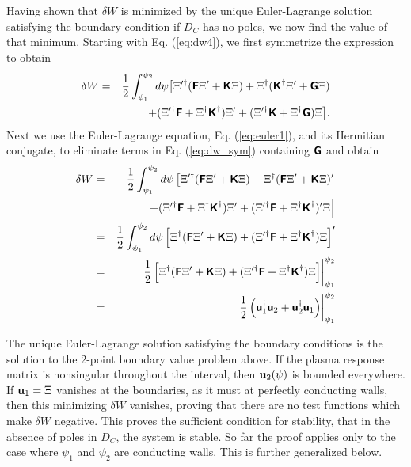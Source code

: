 \documentclass[prb,twocolumn,showpacs,preprintnumbers,amsmath,amssymb]{revtex4}
\renewcommand*{\v}[1]{\hbox{\bfseries #1}}
\renewcommand*{\t}[1]{\hbox{\sffamily\bfseries #1}}
\begin{document}
Having shown that $\delta W$ is minimized by the unique Euler-Lagrange
solution satisfying the boundary condition if $D_C$ has no poles, we now
find the value of that minimum.  Starting with Eq. (\ref{eq:dw4}), we
first symmetrize the expression to obtain
\begin{eqnarray}
\delta W =&& \frac{1}{2} \int_{\psi_1}^{\psi_2} d\psi \big[ 
	\Xi'^\dagger (\t{F} \Xi' + \t{K} \Xi) 
	+ \Xi^\dagger (\t{K}^\dagger \Xi' + \t{G} \Xi) \nonumber \\
&&+ ( \Xi'^\dagger \t{F} + \Xi^\dagger \t{K}^\dagger) \Xi'
	+ ( \Xi'^\dagger \t{K} + \Xi^\dagger \t{G}) \Xi \big].
\label{eq:dw_sym}
\end{eqnarray}
Next we use the Euler-Lagrange equation, Eq. (\ref{eq:euler1}), and its
Hermitian conjugate, to eliminate terms in Eq. (\ref{eq:dw_sym})
containing $\t{G}$ and obtain
\begin{eqnarray}
\delta W
=&& \frac{1}{2} \int_{\psi_1}^{\psi_2} d\psi \left[ 
	\Xi'^\dagger (\t{F} \Xi' + \t{K} \Xi) 
	+ \Xi^\dagger (\t{F} \Xi' + \t{K} \Xi)' \right. \nonumber \\
&&\left. + ( \Xi'^\dagger \t{F} + \Xi^\dagger \t{K}^\dagger) \Xi'
	+ ( \Xi'^\dagger \t{F} + \Xi^\dagger \t{K}^\dagger)' 
	\Xi \right] \nonumber \\
=&& \frac{1}{2} \int_{\psi_1}^{\psi_2} d\psi \left[ 
	\Xi^\dagger (\t{F} \Xi' + \t{K} \Xi) 
	+ (\Xi'^\dagger \t{F} + \Xi^\dagger \t{K}^\dagger)
	\Xi \right]' \nonumber \\
=&& \left. \frac{1}{2} \left[ 
	\Xi^\dagger (\t{F} \Xi' + \t{K} \Xi)
	+ (\Xi'^\dagger \t{F} + \Xi^\dagger \t{K}^\dagger) \Xi
	 \right] \right|_{\psi_1}^{\psi_2} \nonumber \\
=&& \left. \frac{1}{2} \left( \t{u}_1^\dagger \t{u}_2 
	+ \t{u}_2^\dagger \t{u}_1 \right) \right|_{\psi_1}^{\psi_2}
\label{eq:dw_boundary}
\end{eqnarray}

	The unique Euler-Lagrange solution satisfying the boundary
conditions is the solution to the 2-point boundary value problem above.
If the plasma response matrix is nonsingular throughout the interval,
then $\v{u}_2(\psi)$ is bounded everywhere.  If $\v{u}_1=\Xi$ vanishes
at the boundaries, as it must at perfectly conducting walls, then this
minimizing $\delta W$ vanishes, proving that there are no test functions
which make $\delta W$ negative.  This proves the sufficient condition
for stability, that in the absence of poles in $D_C$, the system is
stable.  So far the proof applies only to the case where $\psi_1$ and
$\psi_2$ are conducting walls.  This is further generalized below.
\end{document}

